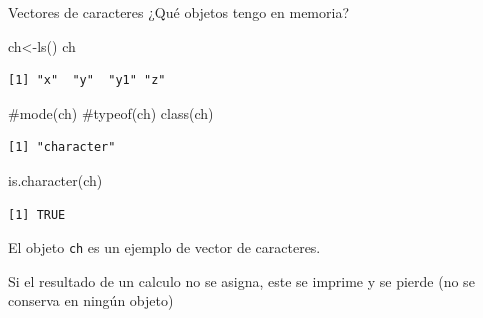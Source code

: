 \documentclass[
  ignorenonframetext,
  aspectratio=169,
  spanish,
]{beamer}
\newenvironment{Shaded}{\begin{snugshade}}{\end{snugshade}}
\newcommand{\CommentTok}[1]{\textcolor[rgb]{0.37,0.37,0.37}{#1}}
\newcommand{\FunctionTok}[1]{\textcolor[rgb]{0.28,0.35,0.67}{#1}}
\newcommand{\NormalTok}[1]{\textcolor[rgb]{0.00,0.23,0.31}{#1}}
\newcommand{\OtherTok}[1]{\textcolor[rgb]{0.00,0.23,0.31}{#1}}
\begin{document}
\begin{frame}[fragile]{Vectores de caracteres}
\label{vectores-de-caracteres}
¿Qué objetos tengo en memoria?

\begin{Shaded}
\begin{Highlighting}[]
\NormalTok{ch}\OtherTok{\textless{}{-}}\FunctionTok{ls}\NormalTok{() }
\NormalTok{ch}
\end{Highlighting}
\end{Shaded}

\begin{verbatim}
[1] "x"  "y"  "y1" "z" 
\end{verbatim}

\begin{Shaded}
\begin{Highlighting}[]
\CommentTok{\#mode(ch)}
\CommentTok{\#typeof(ch)}
\FunctionTok{class}\NormalTok{(ch)}
\end{Highlighting}
\end{Shaded}

\begin{verbatim}
[1] "character"
\end{verbatim}

\begin{Shaded}
\begin{Highlighting}[]
\FunctionTok{is.character}\NormalTok{(ch)}
\end{Highlighting}
\end{Shaded}

\begin{verbatim}
[1] TRUE
\end{verbatim}

El objeto \texttt{ch} es un ejemplo de vector de caracteres.

Si el resultado de un calculo no se asigna, este se imprime y se pierde
(no se conserva en ningún objeto)
\end{frame}
\end{document}
